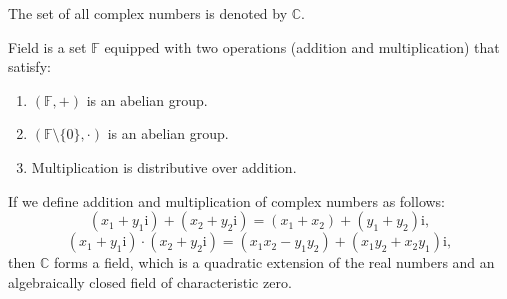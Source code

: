The set of all complex numbers is denoted by \(\mathbb{C}\).

\vspace{0.7cm}
Field is a set \(\mathbb{F}\) equipped with two operations (addition and multiplication) that satisfy:
\begin{enumerate}
    \item \((\mathbb{F}, +)\) is an abelian group.
    \item \((\mathbb{F} \setminus \{0\}, \cdot)\) is an abelian group.
    \item Multiplication is distributive over addition.
\end{enumerate}
If we define addition and multiplication of complex numbers as follows:
\[
    (x_1 + y_1\mathrm{i}) + (x_2 + y_2\mathrm{i}) = (x_1 + x_2) + (y_1 + y_2)\mathrm{i},
\]
\[
    (x_1 + y_1\mathrm{i}) \cdot (x_2 + y_2\mathrm{i}) = (x_1 x_2 - y_1 y_2) + (x_1 y_2 + x_2 y_1)\mathrm{i},
\]
then \(\mathbb{C}\) forms a field, 
which is a quadratic extension of the real numbers and an algebraically closed field of characteristic zero.

